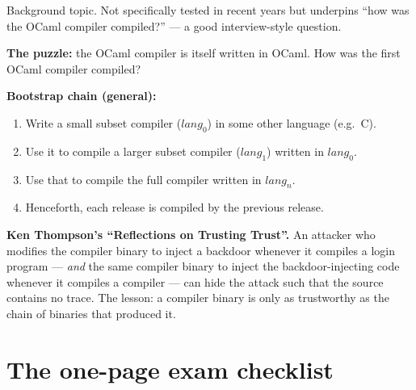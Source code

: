 \documentclass[11pt,a4paper]{article}
\begin{document}
\begin{useful}
Background topic. Not specifically tested in recent years but underpins ``how was the OCaml compiler compiled?'' --- a good interview-style question.
\end{useful}

\textbf{The puzzle:} the OCaml compiler is itself written in OCaml. How was the first OCaml compiler compiled?

\textbf{Bootstrap chain (general):}
\begin{enumerate}[leftmargin=*,itemsep=0pt]
  \item Write a small subset compiler ($\mathit{lang}_0$) in some other language (e.g.\ C).
  \item Use it to compile a larger subset compiler ($\mathit{lang}_1$) written in $\mathit{lang}_0$.
  \item Use that to compile the full compiler written in $\mathit{lang}_n$.
  \item Henceforth, each release is compiled by the previous release.
\end{enumerate}

\textbf{Ken Thompson's ``Reflections on Trusting Trust''.} An attacker who modifies the compiler binary to inject a backdoor whenever it compiles a login program --- \emph{and} the same compiler binary to inject the backdoor-injecting code whenever it compiles a compiler --- can hide the attack such that the source contains no trace. The lesson: a compiler binary is only as trustworthy as the chain of binaries that produced it.

\hrulefill

\section{The one-page exam checklist}
\end{document}
